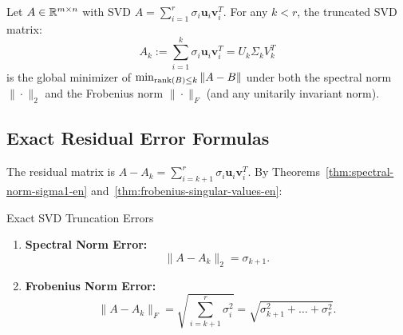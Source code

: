 \begin{theorem}
\label{thm:eckart-young-en}
Let $A \in \mathbb{R}^{m \times n}$ with SVD $A = \sum_{i=1}^r \sigma_i \mathbf{u}_i \mathbf{v}_i^T$. For any $k < r$, the truncated SVD matrix:
\begin{equation}
    A_k := \sum_{i=1}^k \sigma_i \mathbf{u}_i \mathbf{v}_i^T = U_k \Sigma_k V_k^T
\end{equation}
is the global minimizer of $\min_{\operatorname{rank}(B) \le k} \|A - B\|$ under both the spectral norm $\|\cdot\|_2$ and the Frobenius norm $\|\cdot\|_F$ (and any unitarily invariant norm).
\end{theorem}

\subsection{Exact Residual Error Formulas}

The residual matrix is $A - A_k = \sum_{i=k+1}^r \sigma_i \mathbf{u}_i \mathbf{v}_i^T$. By Theorems~\ref{thm:spectral-norm-sigma1-en} and~\ref{thm:frobenius-singular-values-en}:

\begin{alertblock}{Exact SVD Truncation Errors}
\begin{enumerate}
    \item \textbf{Spectral Norm Error:}
    \begin{equation}
        \|A - A_k\|_2 = \sigma_{k+1}.
    \end{equation}
    \item \textbf{Frobenius Norm Error:}
    \begin{equation}
        \|A - A_k\|_F = \sqrt{\sum_{i=k+1}^r \sigma_i^2} = \sqrt{\sigma_{k+1}^2 + \dots + \sigma_r^2}.
    \end{equation}
\end{enumerate}
\end{alertblock}

